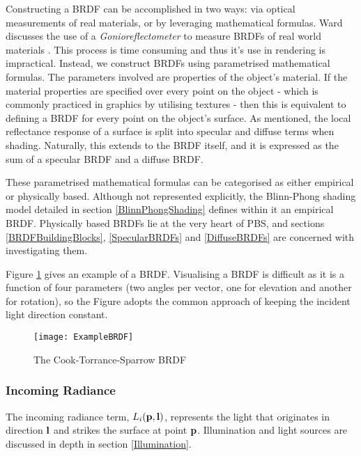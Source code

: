 Constructing a BRDF can be accomplished in two ways: via optical measurements of real materials, or by leveraging mathematical formulas. Ward discusses the use of a \textit{Gonioreflectometer} to measure BRDFs of real world materials \cite{MeasuringAnisotropicReflections}. This process is time consuming and thus it's use in rendering is impractical. Instead, we construct BRDFs using parametrised mathematical formulas. The parameters involved are properties of the object's material. If the material properties are specified over every point on the object - which is commonly practiced in graphics by utilising textures - then this is equivalent to defining a BRDF for every point on the object's surface. As mentioned, the local reflectance response of a surface is split into specular and diffuse terms when shading. Naturally, this extends to the BRDF itself, and it is expressed as the sum of a specular BRDF and a diffuse BRDF.

These parametrised mathematical formulas can be categorised as either empirical or physically based. Although not represented explicitly, the Blinn-Phong shading model detailed in section \ref{BlinnPhongShading} defines within it an empirical BRDF. Physically based BRDFs lie at the very heart of PBS, and sections \ref{BRDFBuildingBlocks}, \ref{SpecularBRDFs} and \ref{DiffuseBRDFs} are concerned with investigating them.

Figure \ref{fig:ExampleBRDF} gives an example of a BRDF. Visualising a BRDF is difficult as it is a function of four parameters (two angles per vector, one for elevation and another for rotation), so the Figure adopts the common approach of keeping the incident light direction constant.

\begin{figure}[h]
	\centering
	\texttt{[image: ExampleBRDF]}
	\caption{The Cook-Torrance-Sparrow BRDF~\cite{VisualisingBRDFs}}
	\label{fig:ExampleBRDF}
\end{figure}

\subsubsection{Incoming Radiance}

The incoming radiance term, \begin{math}L_i(\mathbf{p}, \mathbf{l})\end{math}, represents the light that originates in direction \begin{math}\mathbf{l}\end{math} and strikes the surface at point \begin{math}\mathbf{p}\end{math}. Illumination and light sources are discussed in depth in section \ref{Illumination}.

